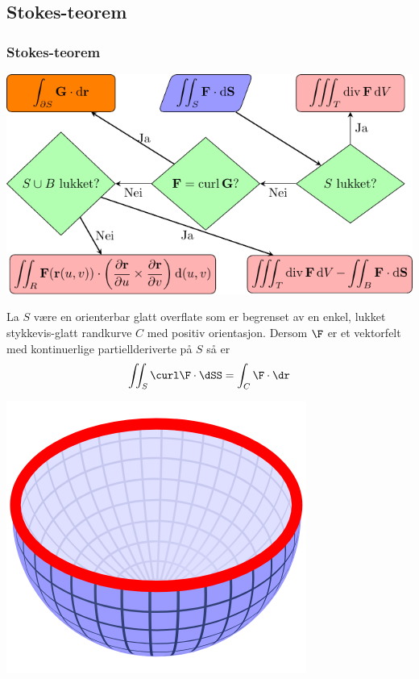 \begin{frame}
  \subsection{Stokes-teorem}\label{subsec:Stokes-teorem}
  \frametitle{Stokes-teorem}
  \centerline{%
    \includegraphics{../img/flytskjema-overflateintegral-2}
  }

\end{frame}
\begin{frame}
\begin{theorem}
  La $S$ være en orienterbar glatt overflate som er begrenset av en enkel,
  lukket stykkevis-glatt randkurve $C$ med positiv orientasjon. Dersom $\F$ er
  et vektorfelt med kontinuerlige partiellderiverte på $S$ så er
  \begin{equation*}
    \iint_S \curl \F \cdot \dSS = \int_C \F \cdot \dr
  \end{equation*}
\end{theorem}
\centerline{
  \includegraphics[scale=0.5]{../img/stokes-surface.png}
}
\end{frame}
